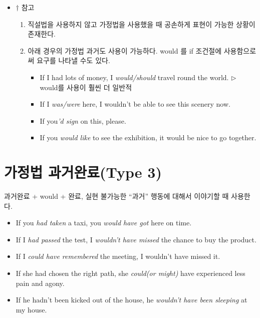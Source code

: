 \documentclass[ a4paper]{oblivoir}
\begin{document}
    \begin{itemize}[label = {}]
        \item {\footnotesize $\dagger$ 참고

        \begin{enumerate}
            \item 직설법을 사용하지 않고 가정법을 사용했을 때 공손하게 표현이 가능한 상황이 존재한다. 
            \item 아래 경우의 가정법 과거도 사용이 가능하다. would 를 if 조건절에 사용함으로써 요구를 나타낼 수도 있다.
                \begin{itemize}[label = {--}]
                    \item If I had lots of money, I \emph{would/should} travel round the world. $\triangleright$ would를 사용이 훨씬 더 일반적
                    \item If I \emph{was/were} here, I wouldn't be able to see this scenery now.
                    \item If you\emph{'d sign} on this, please.
                    \item If you \emph{would like} to see the exhibition, it would be nice to go together.
                \end{itemize}
                
        \end{enumerate}}
    \end{itemize}
    

    
    \section{가정법 과거완료(Type 3)}

    과거완료 + would + 완료, 실현 불가능한 ``과거'' 행동에 대해서 이야기할 때 사용한다. 
    
    \begin{itemize}[label = {--}]
        \item If you \emph{had taken} a taxi, you \emph{would have got} here on time.
        \item If I \emph{had passed} the test, I \emph{wouldn't have missed} the chance to buy the product.
        \item If I \emph{could have remembered} the meeting, I wouldn't have missed it.
        \item If she had chosen the right path, she \emph{could(or might)} have experienced less pain and agony.
        \item If he hadn't been kicked out of the house, he \emph{wouldn't have been sleeping} at my house.
        
    \end{itemize}
    
\end{document}
